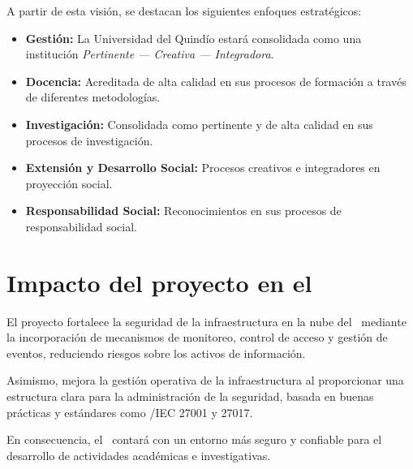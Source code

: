 A partir de esta visión, se destacan los siguientes enfoques estratégicos:

\begin{itemize}
	\item \textbf{Gestión:} La Universidad del Quindío estará consolidada como una institución \textit{Pertinente --- Creativa --- Integradora}.

	\item \textbf{Docencia:} Acreditada de alta calidad en sus procesos de formación a través de diferentes metodologías.

	\item \textbf{Investigación:} Consolidada como pertinente y de alta calidad en sus procesos de investigación.

	\item \textbf{Extensión y Desarrollo Social:} Procesos creativos e integradores en proyección social.

	\item \textbf{Responsabilidad Social:} Reconocimientos en sus procesos de responsabilidad social.
\end{itemize}

\section{Impacto del proyecto en el \GRID}

El proyecto fortalece la seguridad de la infraestructura en la nube del \GRID\ mediante la incorporación de mecanismos de monitoreo, 
control de acceso y gestión de eventos, reduciendo riesgos sobre los activos de información.

Asimismo, mejora la gestión operativa de la infraestructura al proporcionar una estructura clara para la administración de la seguridad, 
basada en buenas prácticas y estándares como \ISO/IEC 27001 y 27017.

En consecuencia, el \GRID\ contará con un entorno más seguro y confiable para el desarrollo de actividades académicas e investigativas.




